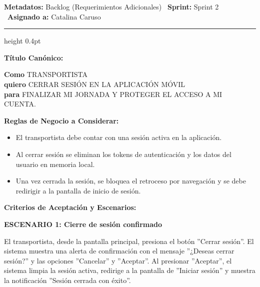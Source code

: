\documentclass[a4paper,9pt]{article}
\begin{document}
\begin{tcolorbox}[hucard, title={\textbf{HU-156: CERRAR SESIÓN} \hfill \scriptsize \colorbox{bluestatus}{\textbf{\ New\ }} \quad \colorbox{white}{\textcolor{primarydark}{\textbf{\ 2 pts\ }}}}]
\vspace{-1pt}
\noindent\textbf{\footnotesize Metadatos:} Backlog (Requerimientos Adicionales) \textbar\ \textbf{Sprint:} Sprint 2 \textbar\ \textbf{Asignado a:} Catalina Caruso\par\vspace{2pt}
\hrule height 0.4pt\par\vspace{3pt}
\noindent\textbf{\footnotesize Título Canónico:}\par\vspace{1pt}
{\small \textbf{Como} TRANSPORTISTA \\ \textbf{quiero} CERRAR SESIÓN EN LA APLICACIÓN MÓVIL \\ \textbf{para} FINALIZAR MI JORNADA Y PROTEGER EL ACCESO A MI CUENTA.}\par\vspace{3pt}
\noindent\textbf{\footnotesize Reglas de Negocio a Considerar:}\par\vspace{1pt}
{\footnotesize
\begin{itemize}[leftmargin=12pt, nosep, itemsep=1.5pt, topsep=1pt]
\item El transportista debe contar con una sesión activa en la aplicación.
\item Al cerrar sesión se eliminan los tokens de autenticación y los datos del usuario en memoria local.
\item Una vez cerrada la sesión, se bloquea el retroceso por navegación y se debe redirigir a la pantalla de inicio de sesión.
\end{itemize}
}\par\vspace{3pt}
\noindent\textbf{\footnotesize Criterios de Aceptación y Escenarios:}\par\vspace{2pt}
{\footnotesize
\noindent\textbf{\textcolor{secondarydark}{ESCENARIO 1:  Cierre de sesión confirmado}}\par\vspace{1pt}
El transportista, desde la pantalla principal, presiona el botón ''Cerrar sesión''. El sistema muestra una alerta de confirmación con el mensaje ''¿Deseas cerrar sesión?'' y las opciones ''Cancelar'' y ''Aceptar''. Al presionar ''Aceptar'', el sistema limpia la sesión activa, redirige a la pantalla de ''Iniciar sesión'' y muestra la notificación ''Sesión cerrada con éxito''.\par\vspace{2.5pt}
}
\end{tcolorbox}
\end{document}
